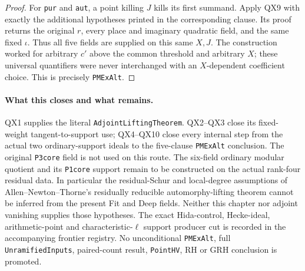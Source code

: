 \begin{proof}
For \texttt{pur} and \texttt{aut}, a point
killing $J$ kills its first summand.  Apply QX9
with exactly the additional hypotheses printed
in the corresponding clause.  Its proof
returns the original $r$, every place and
imaginary quadratic field, and the same fixed
$\iota$.  Thus all five fields are supplied
on this same $X,J$.
The construction worked for arbitrary $c'$
above the common threshold and arbitrary $X$;
these universal quantifiers were never
interchanged with an $X$-dependent coefficient
choice.  This is precisely \texttt{PMExAlt}.
\end{proof}

\paragraph{What this closes and what remains.}
QX1 supplies the literal \texttt{AdjointLiftingTheorem}.
QX2--QX3 close its fixed-weight tangent-to-support use;
QX4--QX10 close every internal step from the actual
two ordinary-support ideals to the five-clause
\texttt{PMExAlt} conclusion.  The original
\texttt{P3core} field is not used on this route.
The six-field ordinary modular quotient and its
\texttt{P1core} support remain to be constructed on
the actual rank-four residual data.  In particular
the residual-Schur and local-degree assumptions
of Allen--Newton--Thorne's residually reducible
automorphy-lifting theorem cannot be inferred from
the present Fit and Deep fields.  Neither this
chapter nor adjoint vanishing supplies those
hypotheses.  The exact Hida-control, Hecke-ideal,
arithmetic-point and characteristic-$\ell$ support
producer cut is recorded in the accompanying
frontier registry.  No unconditional \texttt{PMExAlt},
full \texttt{UnramifiedInputs}, paired-count result,
\texttt{PointHV}, RH or GRH conclusion is promoted.
